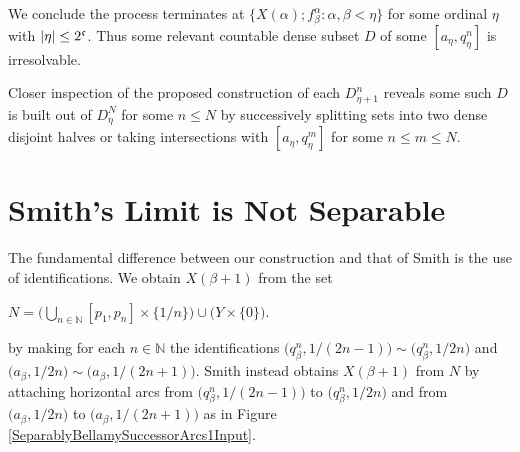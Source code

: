\documentclass[12pt]{article}
\theoremstyle{plain}
\theoremstyle{definition}
\newcommand{\A}{\ensuremath{\alpha}}
\newcommand{\B}{\ensuremath{\beta}}
\newcommand{\NN}{\ensuremath{\mathbb N}}
\newcommand{\0}{\ensuremath{\varnothing}}
\newcommand{\cn}{\ensuremath{\frak c}}
\begin{document}
	We conclude the process terminates at $\{X(\A); f^\A_\B: \A,\B< \eta\}$ for some ordinal $\eta$ with $|\eta| \le 2^\cn$.
	Thus some relevant countable dense subset $D$ of some $[a_{\eta}, q^n_{\eta}]$ is irresolvable.
	
	Closer inspection of the proposed construction of each $D^n_{\eta +1}$ reveals some such $D$ is built out of $D^N_\eta$ for some $n \le N$ 
	by successively splitting sets into two dense disjoint halves or taking intersections with $[a_{\eta}, q^m_{\eta}]$ for some $n \le m \le N$.
	
	\section{Smith's Limit is Not Separable}
	
	\noindent 
	The fundamental difference between our construction and that of Smith \cite{Smith1} is the use of identifications.
	We obtain $X(\B+1)$ from the set
	
	\begin{center}
		$\displaystyle N =  \Big( \bigcup_{n \in \NN}  [p_1,p_n] \times \{1/n\}  \Big ) \cup \big ( Y \times \{0\} \big )$.
	\end{center}
	
	by making for each $n \in \NN$ the identifications $\big (q^n_\B, 1/(2n-1) \big ) \sim \big (q^n_\B, 1/2n \big )$
	and $\big (a_\B, 1/2n \big ) \sim \big (a_\B, 1/(2n+1) \big )$.
	Smith instead obtains $X(\B+1)$ from $N$ by attaching horizontal arcs 
	from $\big (q^n_\B, 1/(2n-1) \big )$ to $\big (q^n_\B, 1/2n \big )$ and from $\big (a_\B, 1/2n \big )$ to $\big (a_\B, 1/(2n+1) \big )$
	as in Figure \ref{SeparablyBellamySuccessorArcs1Input}.
	
\end{document}
